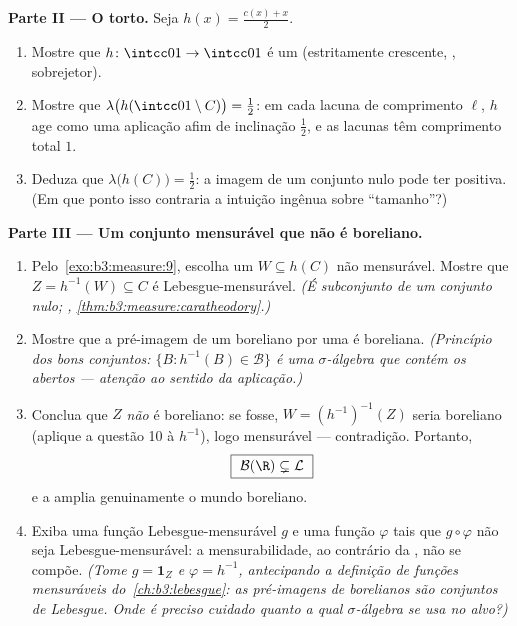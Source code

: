 \begin{problem}
\medskip
\noindent\textbf{Parte II --- O  torto.} Seja $h(x) = \frac{c(x) + x}{2}$.
\begin{enumerate}[resume]
  \item Mostre que $h \colon \intcc01 \to \intcc01$ é um  (estritamente crescente,
        , sobrejetor).
  \item Mostre que $\lambda\bigl(h(\intcc01\setminus C)\bigr) =
        \tfrac12$: em cada lacuna de comprimento $\ell$,
        $h$ age como uma aplicação afim de inclinação $\tfrac12$, e as
        lacunas têm comprimento total $1$.
  \item Deduza que $\lambda\bigl(h(C)\bigr) = \tfrac12$: a imagem  de um conjunto nulo pode
        ter  positiva. (Em que ponto isso contraria a intuição
        ingênua sobre ``tamanho''?)
\end{enumerate}

\medskip
\noindent\textbf{Parte III --- Um conjunto mensurável que não é
boreliano.}
\begin{enumerate}[resume]
  \item Pelo~\cref{exo:b3:measure:9}, escolha um $W
        \subseteq h(C)$ não mensurável. Mostre que
        $Z = h^{-1}(W) \subseteq C$ é Lebesgue-mensurável. \emph{(É subconjunto de um conjunto
        nulo; , \cref{thm:b3:measure:caratheodory}.)}
  \item Mostre que a pré-imagem de um boreliano por uma  é boreliana. \emph{(Princípio dos bons conjuntos:
        $\{B : h^{-1}(B) \in \mathcal B\}$ é uma $\sigma$-álgebra que contém os abertos ---
        atenção ao sentido da aplicação.)}
  \item Conclua que $Z$ \emph{não} é boreliano: se fosse, $W = (h^{-1})^{-1}(Z)$
        seria boreliano (aplique a questão 10 à 
        $h^{-1}$), logo mensurável --- contradição. Portanto,
        \[
        \boxed{\ \mathcal B(\R) \subsetneq \mathcal L\ }
        \]
        e a  amplia genuinamente o mundo boreliano.
  \item Exiba uma função Lebesgue-mensurável $g$ e uma função
         $\varphi$ tais que $g \circ
        \varphi$ não seja Lebesgue-mensurável: a
        mensurabilidade, ao contrário da , não se compõe.
        \emph{(Tome $g =
        \mathbf 1_Z$ e $\varphi = h^{-1}$, antecipando a definição de funções
        mensuráveis do~\cref{ch:b3:lebesgue}: as pré-imagens de borelianos são
        conjuntos de Lebesgue. Onde é preciso cuidado quanto a qual
        $\sigma$-álgebra se usa no alvo?)}
\end{enumerate}


\end{problem}
